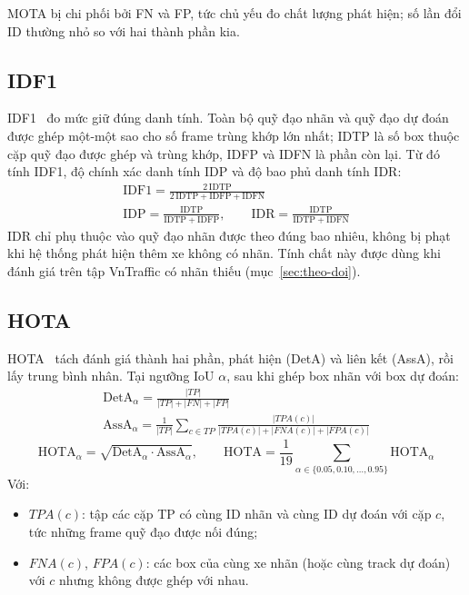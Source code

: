 MOTA bị chi phối bởi FN và FP, tức chủ yếu đo chất lượng phát hiện; số lần đổi ID thường nhỏ so với hai thành phần kia.

\subsection{IDF1}

IDF1~\cite{ristani2016idf1} đo mức giữ đúng danh tính. Toàn bộ quỹ đạo nhãn và quỹ đạo dự đoán được ghép một-một sao
cho số frame trùng khớp lớn nhất; IDTP là số box thuộc cặp quỹ đạo được ghép và trùng khớp, IDFP và IDFN là phần còn lại. Từ đó tính IDF1, độ chính xác danh tính IDP và độ bao phủ danh tính IDR:
\begin{equation}
  \begin{gathered}
    \mathrm{IDF1} = \frac{2\,\mathrm{IDTP}}{2\,\mathrm{IDTP} + \mathrm{IDFP} + \mathrm{IDFN}} \\
    \mathrm{IDP} = \frac{\mathrm{IDTP}}{\mathrm{IDTP} + \mathrm{IDFP}}, \qquad
    \mathrm{IDR} = \frac{\mathrm{IDTP}}{\mathrm{IDTP} + \mathrm{IDFN}}
  \end{gathered}
  \label{eq:idf1}
\end{equation}
IDR chỉ phụ thuộc vào quỹ đạo nhãn được theo đúng bao nhiêu, không bị phạt khi hệ thống phát hiện thêm xe không có
nhãn. Tính chất này được dùng khi đánh giá trên tập VnTraffic có nhãn thiếu (mục~\ref{sec:theo-doi}).

\subsection{HOTA}

HOTA~\cite{luiten2021hota} tách đánh giá thành hai phần, phát hiện (DetA) và liên kết (AssA), rồi lấy trung bình nhân.
Tại ngưỡng IoU $\alpha$, sau khi ghép box nhãn với box dự đoán:
\begin{equation}
  \begin{gathered}
    \mathrm{DetA}_{\alpha} = \frac{|TP|}{|TP| + |FN| + |FP|} \\
    \mathrm{AssA}_{\alpha} = \frac{1}{|TP|} \sum_{c \in TP} \frac{|TPA(c)|}{|TPA(c)| + |FNA(c)| + |FPA(c)|}
  \end{gathered}
  \label{eq:deta-assa}
\end{equation}
\begin{equation}
  \mathrm{HOTA}_{\alpha} = \sqrt{\mathrm{DetA}_{\alpha} \cdot \mathrm{AssA}_{\alpha}}, \qquad
  \mathrm{HOTA} = \frac{1}{19} \sum_{\alpha \in \{0.05, 0.10, \ldots, 0.95\}} \mathrm{HOTA}_{\alpha}
  \label{eq:hota}
\end{equation}
Với:
\begin{itemize}
  \item $TPA(c)$: tập các cặp TP có cùng ID nhãn và cùng ID dự đoán với cặp $c$, tức những frame quỹ đạo được nối đúng;
  \item $FNA(c)$, $FPA(c)$: các box của cùng xe nhãn (hoặc cùng track dự đoán) với $c$ nhưng không được ghép với nhau.
\end{itemize}

